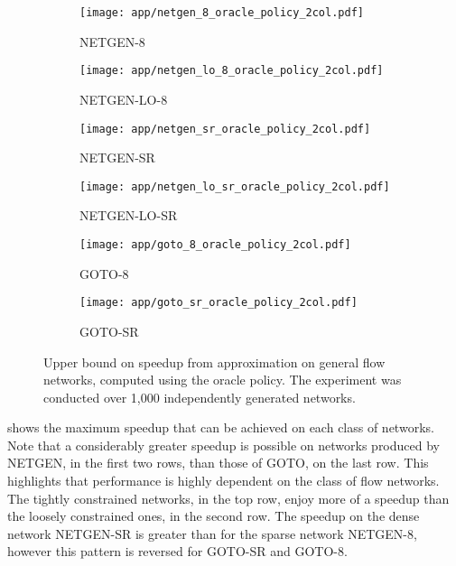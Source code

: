 \begin{figure}
    \begin{widepage}
    \begin{subfigure}[c]{0.5\textwidth}
        \texttt{[image: app/netgen\_8\_oracle\_policy\_2col.pdf]}
        \caption{NETGEN-8}
    \end{subfigure}
    \begin{subfigure}[c]{0.5\textwidth}
        \texttt{[image: app/netgen\_lo\_8\_oracle\_policy\_2col.pdf]}
        \caption{NETGEN-LO-8}
    \end{subfigure}
    \begin{subfigure}[c]{0.5\textwidth}
        \texttt{[image: app/netgen\_sr\_oracle\_policy\_2col.pdf]}
        \caption{NETGEN-SR}
    \end{subfigure}
    \begin{subfigure}[c]{0.5\textwidth}
        \texttt{[image: app/netgen\_lo\_sr\_oracle\_policy\_2col.pdf]}
        \caption{NETGEN-LO-SR}
    \end{subfigure}
    \begin{subfigure}[c]{0.5\textwidth}
        \texttt{[image: app/goto\_8\_oracle\_policy\_2col.pdf]}
        \caption{GOTO-8}
    \end{subfigure}
    \begin{subfigure}[c]{0.5\textwidth}
        \texttt{[image: app/goto\_sr\_oracle\_policy\_2col.pdf]}
        \caption{GOTO-SR}
    \end{subfigure}
    \end{widepage}
    \caption[Upper bound on speedup from approximation on general flow networks]{Upper bound on speedup from approximation on general flow networks, computed using the oracle policy. The experiment was conducted over 1,000 independently generated networks.}
    \label{fig:app-general-oracle-policy}
\end{figure}

 shows the maximum speedup that can be achieved on each class of networks. Note that a considerably greater speedup is possible on networks produced by NETGEN, in the first two rows, than those of GOTO, on the last row. This highlights that performance is highly dependent on the class of flow networks. The tightly constrained networks, in the top row, enjoy more of a speedup than the loosely constrained ones, in the second row. The speedup on the dense network NETGEN-SR is greater than for the sparse network NETGEN-8, however this pattern is reversed for GOTO-SR and GOTO-8.

